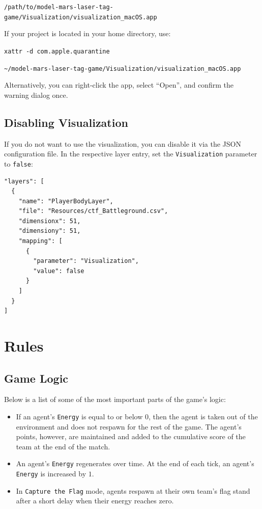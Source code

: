 \documentclass[a4paper,english,DIV=16,11pt,parskip=half,dvipsnames,listof=totoc,index=totoc,bibliography=totoc]{scrartcl}
\begin{document}
\texttt{/path/to/model-mars-laser-tag-game/Visualization/visualization\_macOS.app}

If your project is located in your home directory, use:

\texttt{xattr -d com.apple.quarantine} 

\texttt{\textasciitilde/model-mars-laser-tag-game/Visualization/visualization\_macOS.app}

Alternatively, you can right-click the app, select “Open”, and confirm the warning dialog once.

\subsection{Disabling Visualization}
If you do not want to use the visualization, you can disable it via the JSON configuration file. In the respective layer entry, set the \texttt{Visualization} parameter to \texttt{false}:

\begin{lstlisting}
"layers": [
  {
    "name": "PlayerBodyLayer",
    "file": "Resources/ctf_Battleground.csv",
    "dimensionx": 51,
    "dimensiony": 51,
    "mapping": [
      {
        "parameter": "Visualization",
        "value": false
      }
    ]
  }
]
\end{lstlisting}

%
%
\section{Rules} \label{sec:rules}
%
\subsection{Game Logic}
Below is a list of some of the most important parts of the game's logic:
%
\begin{itemize}
  \item If an agent's \texttt{Energy} is equal to or below 0, then the agent is taken out of the environment and does not respawn for the rest of the game. The agent's points, however, are maintained and added to the cumulative score of the team at the end of the match.
  \item An agent's \texttt{Energy} regenerates over time. At the end of each tick, an agent's \texttt{Energy} is increased by $1$.
  \item In \texttt{Capture the Flag} mode, agents respawn at their own team's flag stand after a short delay when their energy reaches zero.
\end{itemize}
\end{document}
